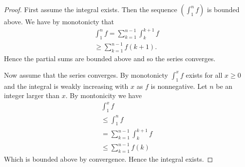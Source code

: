 \documentclass[]{article}
\begin{document}
\begin{proof}
		First assume the integral exists. Then the sequence $(\int_1^nf)$ is bounded above. We have by monotonicty that 
		\begin{align*}
				\int_1^nf = \sum_{k=1}^{n-1} \int_k^{k+1}f \\
				\geq \sum_{k=1}^{n-1} f(k+1).
		\end{align*}
		Hence the partial sums are bounded above and so the series converges.

		Now assume that the series converges. By monotonicty $\int_1^xf$ exists for all $x \geq 0$ and the integral is weakly increasing with $x$ as $f$ is nonnegative. Let $n$ be an integer larger than $x$. By montonicity we have
		\begin{align*}
				\int_1^x f \\
				\leq \int_1^nf \\
				= \sum_{k=1}^{n-1} \int_k^{k+1} f \\
				\leq \sum_{k=1}^{n-1} f(k)
		\end{align*}
		Which is bounded above by convergence. Hence the integral exists.
\end{proof}
\end{document}
